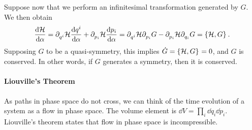 
Suppose now that we perform an infinitesimal transformation generated by $G$. We then obtain
\begin{align*}
	\dv{\ensuremath{\mathcal{H}}}{\alpha} = \partial^{}_{q^{i}}\mathcal{H}\dv{q^{i}}{\alpha} + \partial^{}_{p_{i}}\mathcal{H}\dv{p_{i}}{\alpha} = \partial^{}_{q^{i}}\mathcal{H}\partial^{}_{p_{i}}G - \partial^{}_{p_{i}}\mathcal{H}\partial^{}_{q_{i}}G = \left\{\mathcal{H}, G\right\}_{}.
\end{align*}
Supposing $G$ to be a quasi-symmetry, this implies $\dot{G} = \left\{\mathcal{H}, G\right\}_{} = 0$, and $G$ is conserved. In other words, if $G$ generates a symmetry, then it is conserved.


\paragraph{Liouville's Theorem}
As paths in phase space do not cross, we can think of the time evolution of a system as a flow in phase space. The volume element is $\dd{V} = \prod\limits_{i}\dd{q_{i}}\dd{p_{i}}$. Liouville's theorem states that flow in phase space is incompressible.

